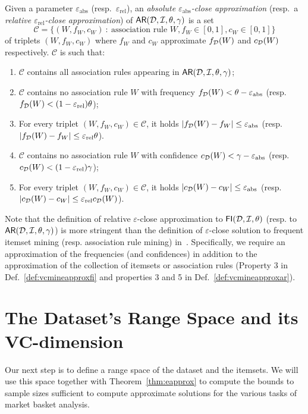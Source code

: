 \begin{definition}\label{def:vcmineapproxar} Given a parameter
  $\varepsilon_{\mathrm{abs}}$ (resp.~$\varepsilon_{\mathrm{rel}}$), an
  \emph{absolute $\varepsilon_{\mathrm{abs}}$-close approximation}  (resp.~a
  \emph{relative $\varepsilon_{\mathrm{rel}}$-close approximation}) of
  $\mathsf{AR}({\cal D},{\cal I},\theta,\gamma)$ is a set 
  \[
  \mathcal{C}=\{(W, f_W, c_W) ~:~
  \mbox{association rule } W, f_W\in[0,1], c_W\in[0,1]\}\]
  of triplets $(W, f_W, c_W)$ where $f_W$ and $c_W$ approximate $f_{\cal D}(W)$ and $c_{\cal D}(W)$
  respectively. $\mathcal{C}$ is such that:
  \begin{enumerate} 
      \item
      $\mathcal{C}$ contains all association rules appearing in
      $\mathsf{AR}({\cal D},{\cal I},\theta,\gamma)$; \item $\mathcal{C}$ contains no association
      rule $W$ with frequency $f_{\cal D}(W)<\theta-\varepsilon_{\mathrm{abs}}$
      (resp. $f_{\cal D}(W)< (1-\varepsilon_{\mathrm{rel}})\theta$);
    \item For every triplet $(W, f_W, c_W)\in\mathcal{C}$, it holds
      $|f_{\cal D}(W)-f_W|\le\varepsilon_\mathrm{abs}$ (resp.
      $|f_{\cal D}(W)-f_W|\le\varepsilon_\mathrm{rel}\theta$).
    \item $\mathcal{C}$ contains no association rule $W$ with confidence
      $c_{\cal D}(W)<\gamma-\varepsilon_{\mathrm{abs}}$ (resp. $c_{\cal D}(W)<
      (1-\varepsilon_{\mathrm{rel}})\gamma$);
    \item For every triplet $(W, f_W, c_W)\in\mathcal{C}$, it holds
      $|c_{\cal D}(W)-c_W|\le\varepsilon_\mathrm{abs}$ (resp.
      $|c_{\cal D}(W)-c_W|\le\varepsilon_\mathrm{rel}c_{\cal D}(W)$).
  \end{enumerate}
\end{definition}

Note that the definition of relative $\varepsilon$-close approximation to
$\mathsf{FI}({\cal D},{\cal I},\theta)$ (resp. to $\mathsf{AR}({\cal D},{\cal I},\theta,\gamma)$) is more
stringent than the definition of $\varepsilon$-close solution to frequent
itemset mining (resp. association rule mining)
in~\cite[Sect.~3]{ChakaravarthyPS09}. Specifically, we require an approximation
of the frequencies (and confidences) in addition to the approximation of
the collection of itemsets or association rules (Property 3 in Def.~\ref{def:vcmineapproxfi} and properties
3 and 5 in Def.~\ref{def:vcmineapproxar}).

\section{The Dataset's Range Space and its VC-dimension}\label{sec:vcminevcdimar}
Our next step is to define a range space of the dataset and the itemsets. We
will use this space together with Theorem~\ref{thm:eapprox} to compute the bounds to
sample sizes sufficient to compute approximate solutions for the various tasks
of market basket analysis. 

